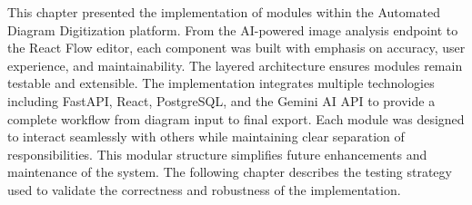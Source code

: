 This chapter presented the implementation of modules within the Automated Diagram Digitization platform. From the AI-powered image analysis endpoint to the React Flow editor, each component was built with emphasis on accuracy, user experience, and maintainability. The layered architecture ensures modules remain testable and extensible. The implementation integrates multiple technologies including FastAPI, React, PostgreSQL, and the Gemini AI API to provide a complete workflow from diagram input to final export. Each module was designed to interact seamlessly with others while maintaining clear separation of responsibilities. This modular structure simplifies future enhancements and maintenance of the system. The following chapter describes the testing strategy used to validate the correctness and robustness of the implementation.